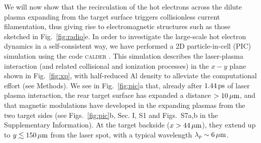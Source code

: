 \documentclass[aps,twocolumn,showpacs,superscriptaddress]{revtex4}
\begin{document}
We will now show that the recirculation of the hot electrons across the dilute plasma expanding from the target surface triggers collisionless current filamentation, thus giving rise to electromagnetic structures such as those sketched in Fig.~\ref{fig:radio}e. In order to investigate the large-scale hot electron dynamics in a self-consistent way, we have performed a 2D particle-in-cell (PIC) simulation using the code \textsc{calder} \cite{NF_Lefebvre_2003}. This simulation describes the laser-plasma interaction (and related collisional and ionization processes) in the $x-y$ plane shown in Fig.~\ref{fig:xp}, with half-reduced Al density to alleviate the computational effort (see Methods).
We see in Fig.~\ref{fig:pic}a that, already after $1.44\,\rm ps$ of laser plasma interaction, the rear target surface has expanded a distance $>10\,\rm \mu m$, and that magnetic modulations have developed in the expanding plasmas from the two target sides (see Figs.~\ref{fig:pic}b, Sec. I, S1 and Figs.~S7a,b in the Supplementary Information). At the target backside ($x>44\,\rm \mu m$), they extend up to $y \lesssim 150\,\rm \mu m$ from the laser spot, with a typical wavelength $\lambda_p \sim 6\,\rm \mu m$.
\end{document}
